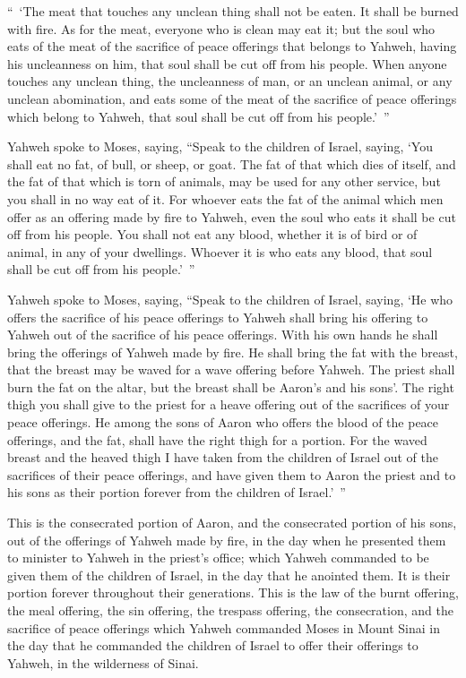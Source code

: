 {\par }{\PP {}“ ‘The meat that touches any unclean thing shall not be eaten. It shall be burned with fire. As for the meat, everyone who is clean may eat it;
but the soul who eats of the meat of the sacrifice of peace offerings that belongs to Yahweh, having his uncleanness on him, that soul shall be cut off from his people.
When anyone touches any unclean thing, the uncleanness of man, or an unclean animal, or any unclean abomination, and eats some of the meat of the sacrifice of peace offerings which belong to Yahweh, that soul shall be cut off from his people.’ ”
\par }{\PP {}Yahweh spoke to Moses, saying,
“Speak to the children of Israel, saying, ‘You shall eat no fat, of bull, or sheep, or goat.
The fat of that which dies of itself, and the fat of that which is torn of animals, may be used for any other service, but you shall in no way eat of it.
For whoever eats the fat of the animal which men offer as an offering made by fire to Yahweh, even the soul who eats it shall be cut off from his people.
You shall not eat any blood, whether it is of bird or of animal, in any of your dwellings.
Whoever it is who eats any blood, that soul shall be cut off from his people.’ ”
\par }{\PP {}Yahweh spoke to Moses, saying,
“Speak to the children of Israel, saying, ‘He who offers the sacrifice of his peace offerings to Yahweh shall bring his offering to Yahweh out of the sacrifice of his peace offerings.
With his own hands he shall bring the offerings of Yahweh made by fire. He shall bring the fat with the breast, that the breast may be waved for a wave offering before Yahweh.
The priest shall burn the fat on the altar, but the breast shall be Aaron’s and his sons’.
The right thigh you shall give to the priest for a heave offering out of the sacrifices of your peace offerings.
He among the sons of Aaron who offers the blood of the peace offerings, and the fat, shall have the right thigh for a portion.
For the waved breast and the heaved thigh I have taken from the children of Israel out of the sacrifices of their peace offerings, and have given them to Aaron the priest and to his sons as their portion forever from the children of Israel.’ ”
\par }{\PP {}This is the consecrated portion of Aaron, and the consecrated portion of his sons, out of the offerings of Yahweh made by fire, in the day when he presented them to minister to Yahweh in the priest’s office;
which Yahweh commanded to be given them of the children of Israel, in the day that he anointed them. It is their portion forever throughout their generations.
This is the law of the burnt offering, the meal offering, the sin offering, the trespass offering, the consecration, and the sacrifice of peace offerings
which Yahweh commanded Moses in Mount Sinai in the day that he commanded the children of Israel to offer their offerings to Yahweh, in the wilderness of Sinai.

}
